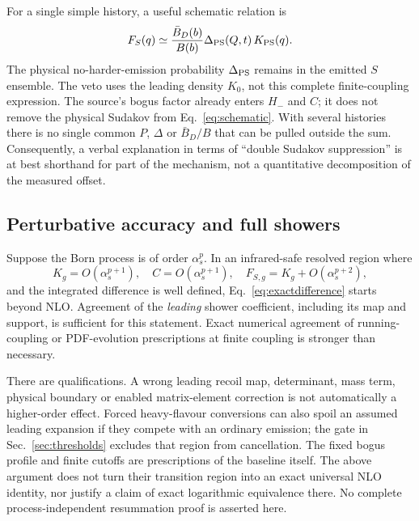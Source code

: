 \documentclass[11pt,a4paper]{article}
\newcommand{\as}{\alpha_s}
\begin{document}
For a single simple history, a useful schematic relation is
\begin{equation}
 F_S(q)\simeq\frac{\bar B_D(b)}{B(b)}
           \Delta_{\rm PS}(Q,t)\,K_{\rm PS}(q).
 \label{eq:schematic}
\end{equation}
The physical no-harder-emission probability $\Delta_{\rm PS}$ remains in
the emitted $S$ ensemble. The veto uses the leading density $K_0$, not
this complete finite-coupling expression. The source's bogus factor
already enters $H_-$ and $C$; it does not remove the physical Sudakov
from Eq.~\eqref{eq:schematic}. With several histories there is no single
common $P$, $\Delta$ or $\bar B_D/B$ that can be pulled outside the sum.
Consequently, a verbal explanation in terms of ``double Sudakov
suppression'' is at best shorthand for part of the mechanism, not a
quantitative decomposition of the measured offset.

\subsection{Perturbative accuracy and full showers}
\label{sec:accuracy}
Suppose the Born process is of order $\as^p$. In an infrared-safe
resolved region where
\begin{equation}
 K_g=O(\as^{p+1}),\quad C=O(\as^{p+1}),\quad
 F_{S,g}=K_g+O(\as^{p+2}),
 \label{eq:expansion}
\end{equation}
and the integrated difference is well defined, Eq.~\eqref{eq:exactdifference}
starts beyond NLO. Agreement of the \emph{leading} shower coefficient,
including its map and support, is sufficient for this statement. Exact
numerical agreement of running-coupling or PDF-evolution prescriptions
at finite coupling is stronger than necessary.

There are qualifications. A wrong leading recoil map, determinant,
mass term, physical boundary or enabled matrix-element correction is
not automatically a higher-order effect. Forced heavy-flavour
conversions can also spoil an assumed leading expansion if they compete
with an ordinary emission; the gate in Sec.~\ref{sec:thresholds} excludes
that region from cancellation. The fixed bogus profile and finite
cutoffs are prescriptions of the baseline itself. The above argument
does not turn their transition region into an exact universal NLO
identity, nor justify a claim of exact logarithmic equivalence there.
No complete process-independent resummation proof is asserted here.
\end{document}
